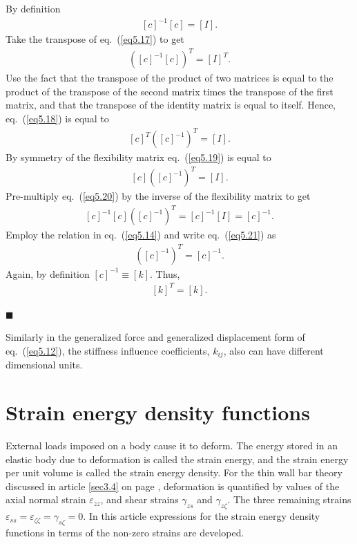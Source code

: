 \documentclass{AeroStructure-ERJohnson}
\begin{document}
\begin{proof*}
By definition
\begin{align}\label{eq5.17}
 [c]^{-1}[c]=[I] .
\end{align}
Take the transpose of eq.~(\ref{eq5.17}) to get
\begin{align}\label{eq5.18}
 ([c]^{-1}[c])^{T}=[I]^{T} .
\end{align}
Use the fact that the transpose of the product of two matrices is equal to the product of the transpose of the second matrix times the transpose of the first matrix, and that the transpose of the identity matrix is equal to itself. Hence, eq.~(\ref{eq5.18}) is equal to
\begin{align}\label{eq5.19}
 [c]^{T}([c]^{-1})^{T}=[I] .
\end{align}
By symmetry of the flexibility matrix eq.~(\ref{eq5.19}) is equal to
\begin{align}\label{eq5.20}
 [c]([c]^{-1})^{T}=[I] .
\end{align}
Pre-multiply eq.~(\ref{eq5.20}) by the inverse of the flexibility matrix to get
\begin{align}\label{eq5.21}
 [c]^{-1}[c]([c]^{-1})^{T}=[c]^{-1}[I]=[c]^{-1} .
\end{align}
Employ the relation in eq.~(\ref{eq5.14}) and write eq.~(\ref{eq5.21}) as
\begin{align}\label{eq5.22}
([c]^{-1})^{T}=[c]^{-1}.
\end{align}
Again, by definition $[c]^{-1} \equiv[k]$. Thus,
\begin{align}\label{eq5.23}
 [k]^{T}=[k] .
\end{align}
\end{proof*}\hfill$\blacksquare$

Similarly in the generalized force and generalized displacement form of eq.~(\ref{eq5.12}), the stiffness influence coefficients, $k_{i j}$, also can have different dimensional units.
\vspace*{10pt}
\clearpage

\section{Strain energy density functions}\label{sec5.3}

External loads imposed on a body cause it to deform. The energy stored in an elastic body due to deformation is called the strain energy, and the strain energy per unit volume is called the strain energy density. For the thin wall bar theory discussed in article \ref{sec3.4} on page \pageref{sec3.4}, deformation is quantified by values of the axial normal strain $\varepsilon_{z z}$, and shear strains $\gamma_{z s}$ and $\gamma_{z \zeta}$. The three remaining strains $\varepsilon_{s s}=\varepsilon_{\zeta \zeta}=\gamma_{s \zeta}=0$. In this article expressions for the strain energy density functions in terms of the non-zero strains are developed.
\end{document}
